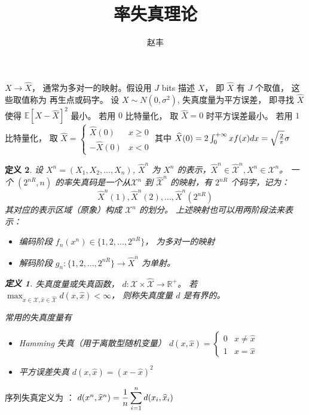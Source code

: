 \documentclass{article}
\author{赵丰}
\title{率失真理论}
\def\E{\mathbb{E}}
\newtheorem{definition}{定义}
\begin{document}
\maketitle

$ X \to \hat{X} $， 通常为多对一的映射。假设用 $J$ bits 描述 $X$， 即 $\hat{X}$ 有 $J$ 个取值， 这些取值称为
再生点或码字。
设 $ X \sim N(0, \sigma^2) $, 失真度量为平方误差， 即寻找 $ \hat{X} $ 使得 $ \E[X - \hat{X} ]^2 $ 最小。
若用 $0$ 比特量化， 取 $ \hat{X} = 0 $ 时平方误差最小。
若用 $1$ 比特量化， 取 $ \hat{X} = \begin{cases} \widehat{X}(0) & x \geq 0 \\ - \widehat{X}(0) & x < 0 \end{cases} $
其中 $ \widehat{X}(0) = 2\int_0^{+\infty} xf(x)dx = \sqrt{2 \over \pi}\sigma $
\begin{definition}
设 $ X^n = (X_1, X_2, \dots, X_n) $, $\widehat{X}^n $ 为 $X^n $ 的表示，$\widehat{X}^n \in \widehat{\mathcal{X}}^n, X^n \in \mathcal{X}^n $。
一个 $(2^{nR}, n) $ 的率失真码是一个从$ \mathcal{X}^n $ 到 $\widehat{\mathcal{X}}^n $ 的映射，有 $ 2^{nR}$ 个码字，记为：
$$
\widehat{X}^n(1), \widehat{X}^n(2), \dots, \widehat{X}^n(2^{nR})
$$
其对应的表示区域（原象）构成 $\mathcal{X}^n$ 的划分。
上述映射也可以用两阶段法来表示：
\begin{itemize}
\item 编码阶段 $ f_n(x^n) \in \{ 1, 2, \dots, 2^{nR} \} $， 为多对一的映射
\item 解码阶段 $ g_n: \{ 1, 2, \dots, 2^{nR} \} \to \widehat{X}^n $ 为单射。
\end{itemize}
\begin{definition}
失真度量或失真函数， $ d: \mathcal{X} \times \widehat{\mathcal{X}} \to \mathbb{R}^{+} $。 若  $\displaystyle\max_{x\in \mathcal{X}, \widehat{x} \in 
\widehat{\mathcal{X}}} d(x,\widehat{x}) < \infty $， 则称失真度量 $ d $ 是有界的。
\end{definition}
常用的失真度量有 
\begin{itemize}
\item Hamming 失真（用于离散型随机变量） $ d(x, \widehat{x}) = \begin{cases} 0 & x \neq \widehat{x} \\ 1 & x = \widehat{x} \end{cases} $
\item 平方误差失真 $ d(x, \widehat{x})  = (x - \widehat{x})^2 $
\end{itemize}
\end{definition}
序列失真定义为 ： $ d(x^n, \widehat{x}^n ) = \displaystyle{ 1 \over n} \displaystyle\sum_{i=1}^n d(x_i, \widehat{x}_i) $
\end{document}
